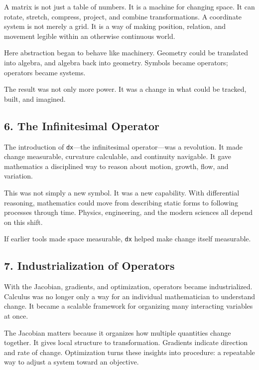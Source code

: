 \documentclass[
]{article}
\begin{document}
A matrix is not just a table of numbers. It is a machine for changing
space. It can rotate, stretch, compress, project, and combine
transformations. A coordinate system is not merely a grid. It is a way
of making position, relation, and movement legible within an otherwise
continuous world.

Here abstraction began to behave like machinery. Geometry could be
translated into algebra, and algebra back into geometry. Symbols became
operators; operators became systems.

The result was not only more power. It was a change in what could be
tracked, built, and imagined.

\hypertarget{the-infinitesimal-operator}{%
\subsection{6. The Infinitesimal
Operator}\label{the-infinitesimal-operator}}

The introduction of \texttt{dx}---the infinitesimal operator---was a
revolution. It made change measurable, curvature calculable, and
continuity navigable. It gave mathematics a disciplined way to reason
about motion, growth, flow, and variation.

This was not simply a new symbol. It was a new capability. With
differential reasoning, mathematics could move from describing static
forms to following processes through time. Physics, engineering, and the
modern sciences all depend on this shift.

If earlier tools made space measurable, \texttt{dx} helped make change
itself measurable.

\hypertarget{industrialization-of-operators}{%
\subsection{7. Industrialization of
Operators}\label{industrialization-of-operators}}

With the Jacobian, gradients, and optimization, operators became
industrialized. Calculus was no longer only a way for an individual
mathematician to understand change. It became a scalable framework for
organizing many interacting variables at once.

The Jacobian matters because it organizes how multiple quantities change
together. It gives local structure to transformation. Gradients indicate
direction and rate of change. Optimization turns these insights into
procedure: a repeatable way to adjust a system toward an objective.
\end{document}

